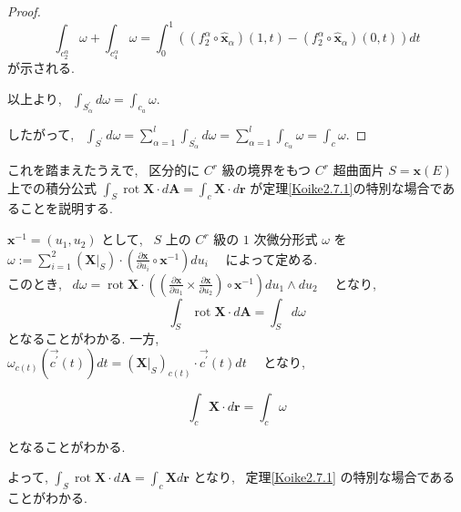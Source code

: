 \documentclass[12pt,a4j,final]{jreport}
\theoremstyle{definition}
\begin{document}
\begin{proof}
\begin{equation*}
 \displaystyle \int_{c_{2}^{\alpha}} \omega + \int_{c_{4}^{\alpha}} \omega
= \int_{0}^{1}\left(\left(f_{2}^{\alpha} \circ \hat{\boldsymbol{x}}_{\alpha}\right)(1, t)-\left(f_{2}^{\alpha} \circ \hat{\boldsymbol{x}}_{\alpha}\right)(0, t)\right) d t 
\end{equation*}
が示される.

以上より, \ $\displaystyle \int_{S_{\alpha}^{\prime}} d \omega = \int_{c_{a}} \omega$.

したがって, \ $\displaystyle \int_{S^{\prime}} d \omega
=\sum_{\alpha=1}^{l} \int_{S_{\alpha}^{\prime}} d \omega
=\sum_{\alpha=1}^{l} \int_{c_{\alpha}} \omega 
=\int_{c} \omega$.

\end{proof}

これを踏まえたうえで, \ 区分的に $C^r$ 級の境界をもつ $C^r$ 超曲面片 $S = \boldsymbol{x}(E)$ 上での積分公式 $\displaystyle \int_{S} \operatorname{rot} \boldsymbol{X} \cdot d\boldsymbol{A}
=\int_{c} \boldsymbol{X} \cdot d \boldsymbol{r}$ が定理\ref{Koike2.7.1}の特別な場合であることを説明する.

$\boldsymbol{x}^{-1} = (u_{1}, u_{2})$ として, \ $S$ 上の $C^{r}$ 級の $1$ 次微分形式 $\omega$ を 
$\omega:= \displaystyle \sum_{i=1}^{2}(\boldsymbol{X} |_S) \cdot\left(\frac{\partial \boldsymbol{x}}{\partial u_{i}} \circ \boldsymbol{x}^{-1}\right) d u_{i} \quad$ によって定める.\\
このとき, \ $d \omega = 
\operatorname{rot} \boldsymbol{X} \cdot\left(\left(\frac{\partial \boldsymbol{x}}{\partial u_{1}} \times \frac{\partial \boldsymbol{x}}{\partial u_{2}}\right) \circ \boldsymbol{x}^{-1}\right) 
d u_{1} \wedge d u_{2} \quad$ となり,
\begin{equation*}
  \displaystyle \int_{S} \operatorname{rot} \boldsymbol{X} \cdot d \boldsymbol{A} =
\int_{S} d \omega
\end{equation*}
となることがわかる. 一方,\\
$\omega_{c(t)} (\overrightarrow{c^{\prime}}(t)) d t
=
\left(\boldsymbol{X}|_{S}\right)_{c(t)} \cdot \overrightarrow{c^{\prime}}(t) d t \quad$ となり,

$$
\int_{c} \boldsymbol{X} \cdot d \boldsymbol{r} = \int_{c} \omega
$$

\noindent
となることがわかる.

よって,
$\displaystyle \int_{S} \operatorname{rot} \boldsymbol{X} \cdot d \boldsymbol{A}
=\int_{c} \boldsymbol{X} d \boldsymbol{r}$ となり, \ 定理\ref{Koike2.7.1} の特別な場合であることがわかる.
\end{document}
